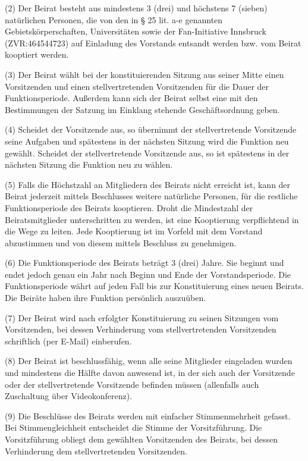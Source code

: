 \documentclass[11pt,a4paper]{article}
\begin{document}
(2)
Der Beirat besteht aus mindestens 3 (drei) und höchstens 7 (sieben) natürlichen Personen, die von den in § 25 lit. a-e genannten Gebietskörperschaften, Universitäten sowie der Fan-Initiative Innsbruck (ZVR:464544723) auf Einladung des Vorstands entsandt werden bzw. vom Beirat kooptiert werden.

(3)
Der Beirat wählt bei der konstituierenden Sitzung aus seiner Mitte einen Vorsitzenden und einen stellvertretenden Vorsitzenden für die Dauer der Funktionsperiode.
Außerdem kann sich der Beirat selbst eine mit den Bestimmungen der Satzung im Einklang stehende Geschäftsordnung geben.

(4)
Scheidet der Vorsitzende aus, so übernimmt der stellvertretende Vorsitzende seine Aufgaben und spätestens in der nächsten Sitzung wird die Funktion neu gewählt.
Scheidet der stellvertretende Vorsitzende aus, so ist spätestens in der nächsten Sitzung die Funktion neu zu wählen.

(5)
Falls die Höchstzahl an Mitgliedern des Beirats nicht erreicht ist, kann der Beirat jederzeit mittels Beschlusses weitere natürliche Personen, für die restliche Funktionsperiode des Beirats kooptieren.
Droht die Mindestzahl der Beiratsmitglieder unterschritten zu werden, ist eine Kooptierung verpflichtend in die Wege zu leiten.
Jede Kooptierung ist im Vorfeld mit dem Vorstand abzustimmen und von diesem mittels Beschluss zu genehmigen.

(6)
Die Funktionsperiode des Beirats beträgt 3 (drei) Jahre.
Sie beginnt und endet jedoch genau ein Jahr nach Beginn und Ende der Vorstandsperiode.
Die Funktionsperiode währt auf jeden Fall bis zur Konstituierung eines neuen Beirats.
Die Beiräte haben ihre Funktion persönlich auszuüben.

(7)
Der Beirat wird nach erfolgter Konstituierung zu seinen Sitzungen vom Vorsitzenden, bei dessen Verhinderung vom stellvertretenden Vorsitzenden schriftlich (per E-Mail) einberufen.

(8)
Der Beirat ist beschlussfähig, wenn alle seine Mitglieder eingeladen wurden und mindestens die Hälfte davon anwesend ist, in der sich auch der Vorsitzende oder der stellvertretende Vorsitzende befinden müssen (allenfalls auch Zuschaltung über Videokonferenz).

(9)
Die Beschlüsse des Beirats werden mit einfacher Stimmenmehrheit gefasst.
Bei Stimmengleichheit entscheidet die Stimme der Vorsitzführung.
Die Vorsitzführung obliegt dem gewählten Vorsitzenden des Beirats, bei dessen Verhinderung dem stellvertretenden Vorsitzenden.
\end{document}
